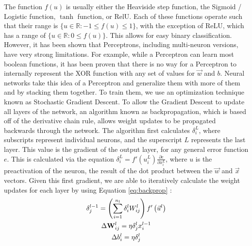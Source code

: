 \documentclass[pageno]{jpaper}
\begin{document}
The function $f(u)$ is usually either the Heaviside step function, the Sigmoid / Logistic function, $\tanh$ function, or RelU.  Each of these functions operate such that their range is $\{u \in \mathbb{R} : -1 \leq f(u) \leq 1\}$, with the exception of ReLU, which has a range of $\{u \in \mathbb{R} : 0 \leq f(u)\}$.  This allows for easy binary classification.  However, it has been shown that Perceptrons, including multi-neuron versions, have very strong limitations.  For example, while a Perceptron can learn most boolean functions, it has been proven that there is no way for a Perceptron to internally represent the XOR function with any set of values for $\vec{w}$ and $b$.  Neural networks take this idea of a Perceptron and generalize them with more of them and by stacking them together.  To train them, we use an optimization technique known as Stochastic Gradient Descent.  To allow the Gradient Descent to update all layers of the network, an algorithm known as backpropagation, which is based off of the derivative chain rule, allows weight updates to be propagated backwards through the network.  The algorithm first calculates $\delta_{i}^{L}$, where subscripts represent individual neurons, and the superscript $L$ represents the last layer.  This value is the gradient of the output layer, for any general error function $e$.  This is calculated via the equation $\delta_{i}^{L} = f'\left(u_{i}^{L}\right) \frac{\partial e}{\partial x_{i}^{L}}$, where $u$ is the preactivation of the neuron, the result of the dot product between the $\vec{w}$ and $\vec{x}$ vectors.  Given this first gradient, we are able to iteratively calculate the weight updates for each layer by using Equation \ref{eq:backprop} \cite{seung:2017}:
\begin{subequations}
	\label{eq:backprop}
	\allowdisplaybreaks
	\begin{gather}
	\delta_{j}^{l - 1} = \left(\sum_{i = 1}^{n_{l}} \delta_{i}^{l} W_{ij}^{l} \right)  f'\left(\vec{u}^{l}\right) \\
	\Delta\mathbf{W}_{ij}^{l} = \eta \delta_{j}^{l} x_{i}^{l - 1} \\
	\Delta b_{i}^{l} = \eta \delta_{j}^{l}
	\end{gather}
\end{subequations}
\end{document}
